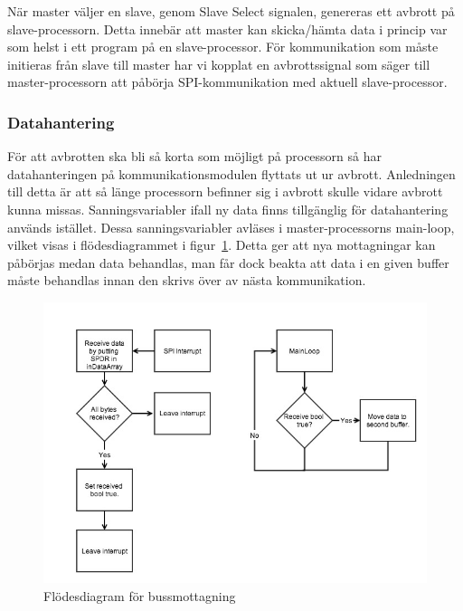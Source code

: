 \documentclass[a4paper,12pt,fleqn]{article}
\begin{document}
När master väljer en slave, genom Slave Select signalen, genereras ett avbrott på slave-processorn. Detta innebär att master kan skicka/hämta data i princip var som helst i ett program på en slave-processor. För kommunikation som måste initieras från slave till master har vi kopplat en avbrottssignal som säger till master-processorn att påbörja SPI-kommunikation med aktuell slave-processor.

\subsubsection{Datahantering}
För att avbrotten ska bli så korta som möjligt på processorn så har datahanteringen på kommunikationsmodulen flyttats ut ur avbrott. Anledningen till detta är att så länge processorn befinner sig i avbrott skulle vidare avbrott kunna missas. Sanningsvariabler ifall ny data finns tillgänglig för datahantering används istället. Dessa sanningsvariabler avläses i master-processorns main-loop, vilket visas i flödesdiagrammet i figur~\ref{fig:SPIrec}. Detta ger att nya mottagningar kan påbörjas medan data behandlas, man får dock beakta att data i en given buffer måste behandlas innan den skrivs över av nästa kommunikation.

\begin{figure}[htp] %
  \begin{center}
  \includegraphics[keepaspectratio=true,scale=0.5]{spirec.jpg}  %
  \end{center}
  \caption{Flödesdiagram för bussmottagning} %
  \label{fig:SPIrec}
\end{figure}
\end{document}
